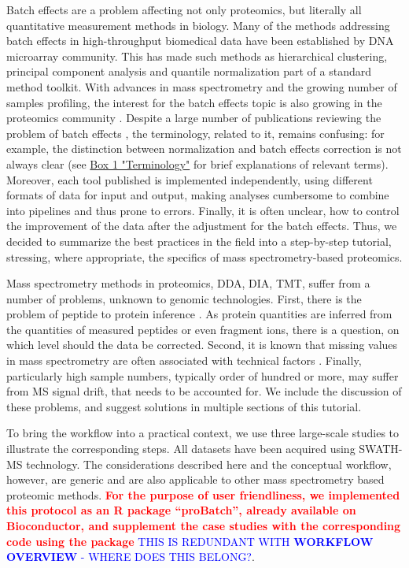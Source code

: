 \documentclass[num-refs]{wiley-article}
\begin{document}
Batch effects are a problem affecting not only proteomics, but literally all quantitative measurement methods in biology. Many of the methods addressing batch effects in high-throughput biomedical data have been established by DNA microarray community. This has made such methods as hierarchical clustering, principal component analysis and quantile normalization part of a standard method toolkit. With advances in mass spectrometry and the growing number of samples profiling, the interest for the batch effects topic is also growing in the proteomics community \cite{Karpievitch2012, Chawade:2014aa, Valikangas2018, Gregori2012}. Despite a large number of publications reviewing the problem of batch effects \cite{Leek:2010aa, Lazar:2013aa, Luo2010, Chen:2011ac, Dillies:2013aa, Chawade:2014aa}, the terminology, related to it, remains confusing: for example, the distinction between normalization and batch effects correction is not always clear (see \hyperref[box:Box1_definitions]{Box 1 "Terminology"} for brief explanations of relevant terms). Moreover, each tool published is implemented independently, using different formats of data for input and output, making analyses cumbersome to combine into pipelines and thus prone to errors. Finally, it is often unclear, how to control the improvement of the data after the adjustment for the batch effects. Thus, we decided to summarize the best practices in the field into a step-by-step tutorial, stressing, where appropriate, the specifics of mass spectrometry-based proteomics.

Mass spectrometry methods in proteomics, DDA, DIA, TMT, suffer from a number of problems, unknown to genomic technologies. First, there is the problem of peptide to protein inference \cite{Clough:2012aa, Teo:2015aa, Rosenberger2014a, Choi2014, Muntel:2019aa}. As protein quantities are inferred from the quantities of measured peptides or even fragment ions, there is a question, on which level should the data be corrected. Second, it is known that missing values in mass spectrometry are often associated with technical factors \cite{Karpievitch2012, Matafora2017}. Finally, particularly high sample numbers, typically order of hundred or more, may suffer from MS signal drift, that needs to be accounted for. We include the discussion of these problems, and suggest solutions in multiple sections of this tutorial.

To bring the workflow into a practical context, we use three large-scale studies to illustrate the corresponding steps. All datasets have been acquired using SWATH-MS technology. The considerations described here and the conceptual workflow, however, are generic and are also applicable to other mass spectrometry based proteomic methods. \textcolor{red}{\textbf{For the purpose of user friendliness, we implemented this protocol as an  R package “proBatch”, already available on Bioconductor, and supplement the case studies with the corresponding code using the package}} \textcolor{blue}{THIS IS REDUNDANT WITH \textbf{WORKFLOW OVERVIEW} - WHERE DOES THIS BELONG?}. 
\end{document}
